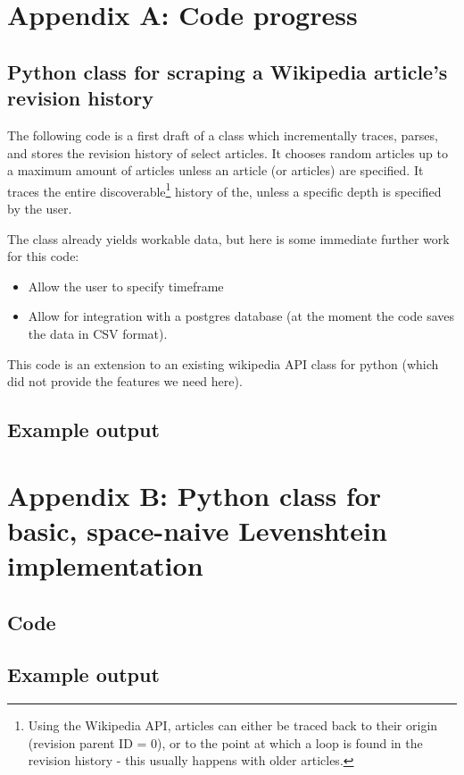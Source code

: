 \documentclass[a4paper,11pt,twoside,notitlepage]{article}
\begin{document}
        
\clearpage
\begin{appendices}
\section{Appendix A: Code progress}
\subsection{Python class for scraping a Wikipedia article's revision history}
The following code is a first draft of a class which incrementally
traces, parses, and stores the revision history of select articles. It
chooses random articles up to a maximum amount of articles unless an
article (or articles) are specified. It traces the entire
discoverable\footnote{Using the Wikipedia API, articles can either be
  traced back to their origin (revision parent ID = 0), or to the
  point at which a loop is found in the revision history - this
  usually happens with older articles.} history of the, unless a
specific depth is specified by the user.

The class already yields workable data, but here is some immediate
further work for this code:
\begin{itemize}
  \item Allow the user to specify timeframe
  \item Allow for integration with a postgres database (at the moment
    the code saves the data in CSV format).
\end{itemize}

This code is an extension to an existing wikipedia API class for
python (which did not provide the features we need
here).\cite{python-wikipedia}


\subsection{Example output}

\clearpage
\section{Appendix B: Python class for basic, space-naive Levenshtein
  implementation}
\subsection{Code}

\clearpage
\subsection{Example output}

\end{appendices}

\clearpage
\renewcommand\refname{Bibliograpy} {}

\end{document}

